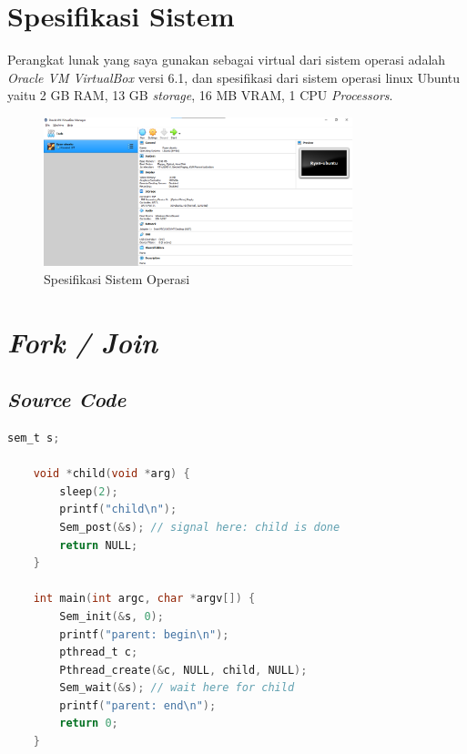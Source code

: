 \documentclass[11pt,a4paper]{article}
\begin{document}
\section{Spesifikasi Sistem}
    Perangkat lunak yang saya gunakan sebagai virtual dari sistem operasi adalah \textit{Oracle VM VirtualBox} versi 6.1, dan spesifikasi dari sistem operasi linux Ubuntu yaitu 2 GB RAM, 13 GB \textit{storage}, 16 MB VRAM, 1 CPU \textit{Processors}. 
    \begin{figure}[h]
    \centering
    \includegraphics[width=0.8\textwidth]{Figure/Spek.png}
    \caption{Spesifikasi Sistem Operasi}
    \label{fig:my_label}
    \end{figure}

\section{\textit{Fork / Join}}
\subsection{\textit{Source Code}}
\begin{lstlisting}[language=C]
	sem_t s;

	void *child(void *arg) {
		sleep(2);
		printf("child\n");
		Sem_post(&s); // signal here: child is done
		return NULL;
	}

	int main(int argc, char *argv[]) {
		Sem_init(&s, 0); 
		printf("parent: begin\n");
		pthread_t c;
		Pthread_create(&c, NULL, child, NULL);
		Sem_wait(&s); // wait here for child
		printf("parent: end\n");
		return 0;
	}
	
\end{lstlisting}
\end{document}
